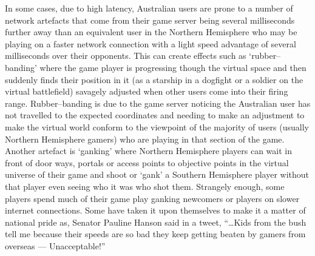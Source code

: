 In some cases, due to high latency, Australian users are prone to a number of network artefacts that come from their game server being several milliseconds further away than an equivalent user in the Northern Hemisphere who may be playing on a faster network connection with a light speed advantage of several milliseconds over their opponents. This can create effects such as `rubber--banding' where the game player is progressing though the virtual space and then suddenly finds their position in it (as a starship in a dogfight or a soldier on the virtual battlefield) savagely adjusted when other users come into their firing range.  Rubber--banding is due to the game server noticing the Australian user has not travelled to the expected coordinates and needing to make an adjustment to make the virtual world conform to the viewpoint of the majority of users (usually Northern Hemisphere gamers) who are playing in that section of the game.  Another artefact is `ganking' where Northern Hemisphere players can wait in front of door ways, portals or access points to objective points in the virtual universe of their game and shoot or `gank' a Southern Hemisphere player without that player even seeing who it was who shot them.  Strangely enough, some players spend much of their game play ganking newcomers or players on slower internet connections. Some have taken it upon themselves to make it a matter of national pride as, Senator Pauline Hanson said in a tweet,  ``\ldots Kids from the bush tell me because their speeds are so bad they keep getting beaten by gamers from overseas --- Unacceptable\cite{RefWorks:307}!''

